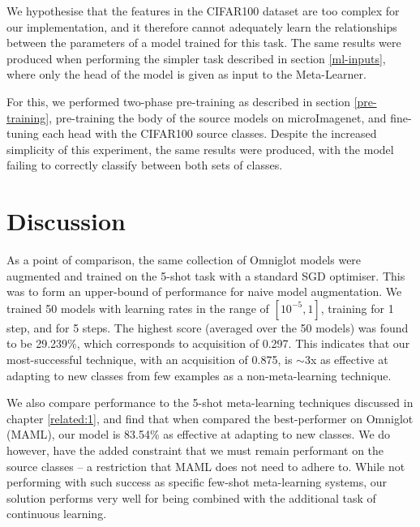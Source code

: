 \documentclass{report}
\begin{document}
We hypothesise that the features in the CIFAR100 dataset are too complex for our implementation, and it therefore cannot adequately learn the relationships between the parameters of a model trained for this task. The same results were produced when performing the simpler task described in section \ref{ml-inputs}, where only the head of the model is given as input to the Meta-Learner. \par
For this, we performed two-phase pre-training as described in section \ref{pre-training}, pre-training the body of the source models on microImagenet, and fine-tuning each head with the CIFAR100 source classes. Despite the increased simplicity of this experiment, the same results were produced, with the model failing to correctly classify between both sets of classes. \par


\section{Discussion}
As a point of comparison, the same collection of Omniglot models were augmented and trained on the 5-shot task with a standard SGD optimiser. This was to form an upper-bound of performance for naive model augmentation. We trained 50 models with learning rates in the range of $[10^{-5}, 1]$, training for 1 step, and for 5 steps. The highest score (averaged over the 50 models) was found to be 29.239\%, which corresponds to acquisition of 0.297. This indicates that our most-successful technique, with an acquisition of 0.875, is $\sim$3x as effective at adapting to new classes from few examples as a non-meta-learning technique. \par
We also compare performance to the 5-shot meta-learning techniques discussed in chapter \ref{related:1}, and find that when compared the best-performer on Omniglot (MAML\parencite{maml}), our model is 83.54\% as effective at adapting to new classes. We do however, have the added constraint that we must remain performant on the source classes -- a restriction that MAML does not need to adhere to. While not performing with such success as specific few-shot meta-learning systems, our solution performs very well for being combined with the additional task of continuous learning. \par
\end{document}
